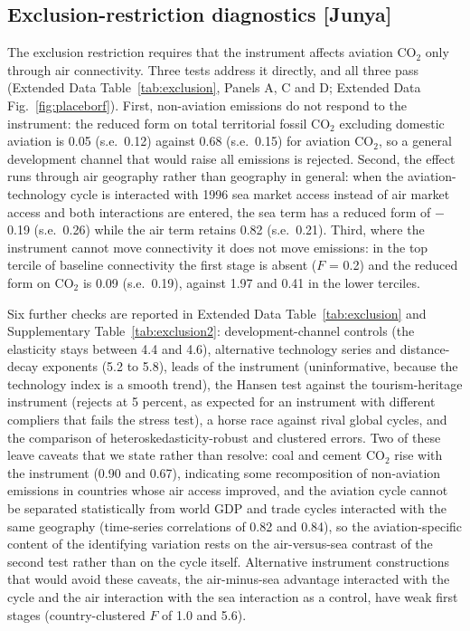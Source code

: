 \documentclass[12pt]{article}
\begin{document}
\subsection*{Exclusion-restriction diagnostics [Junya]}
The exclusion restriction requires that the instrument affects aviation
CO$_2$ only through air connectivity. Three tests address it directly, and
all three pass (Extended Data Table~\ref{tab:exclusion}, Panels A, C and D;
Extended Data Fig.~\ref{fig:placeborf}). First, non-aviation emissions do
not respond to the instrument: the reduced form on total territorial fossil
CO$_2$ excluding domestic aviation is 0.05 (s.e.\ 0.12) against 0.68 (s.e.\
0.15) for aviation CO$_2$, so a general development channel that would
raise all emissions is rejected. Second, the effect runs through air
geography rather than geography in general: when the aviation-technology
cycle is interacted with 1996 sea market access instead of air market
access and both interactions are entered, the sea term has a reduced form
of $-$0.19 (s.e.\ 0.26) while the air term retains 0.82 (s.e.\ 0.21). Third,
where the instrument cannot move connectivity it does not move emissions:
in the top tercile of baseline connectivity the first stage is absent
($F$ = 0.2) and the reduced form on CO$_2$ is 0.09 (s.e.\ 0.19), against
1.97 and 0.41 in the lower terciles.

Six further checks are reported in Extended Data Table~\ref{tab:exclusion}
and Supplementary Table~\ref{tab:exclusion2}: development-channel controls
(the elasticity stays between 4.4 and 4.6), alternative technology series
and distance-decay exponents (5.2 to 5.8), leads of the instrument
(uninformative, because the technology index is a smooth trend), the
Hansen test against the tourism-heritage instrument (rejects at 5 percent,
as expected for an instrument with different compliers that fails the
stress test), a horse race against rival global cycles, and the comparison
of heteroskedasticity-robust and clustered errors. Two of these leave
caveats that we state rather than resolve: coal and cement CO$_2$ rise
with the instrument (0.90 and 0.67), indicating some recomposition of
non-aviation emissions in countries whose air access improved, and the
aviation cycle cannot be separated statistically from world GDP and trade
cycles interacted with the same geography (time-series correlations of
0.82 and 0.84), so the aviation-specific content of the identifying
variation rests on the air-versus-sea contrast of the second test rather
than on the cycle itself. Alternative instrument constructions that would
avoid these caveats, the air-minus-sea advantage interacted with the
cycle and the air interaction with the sea interaction as a control, have
weak first stages (country-clustered $F$ of 1.0 and 5.6).
\end{document}
